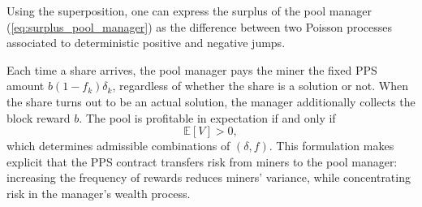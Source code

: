 \begin{remark}
Using the superposition, one can express the surplus of the pool manager (\ref{eq:surplus_pool_manager}) as the difference between two Poisson processes associated to deterministic positive and negative jumps.
\end{remark}


Each time a share arrives, the pool manager pays the miner the fixed PPS amount $b(1-f_k)\delta_k$, regardless of whether the share is a solution or not. When the share turns out to be an actual solution, the manager additionally collects the block reward $b$. The pool is profitable in expectation if and only if
\begin{equation}
\mathbb{E}[V] > 0,
\end{equation}
which determines admissible combinations of $(\delta,f)$. This formulation makes explicit that the PPS contract transfers risk from miners to the pool manager: increasing the frequency of rewards reduces miners' variance, while concentrating risk in the manager’s wealth process.












